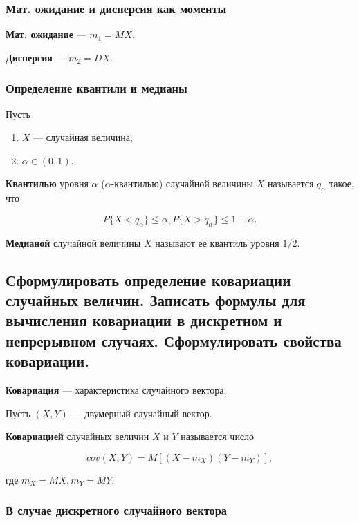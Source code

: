 \subsubsection*{Мат. ожидание и дисперсия как моменты}

\textbf{Мат. ожидание} --- $m_{1} = MX$.

\textbf{Дисперсия} --- $\dot m_{2} = DX$.

\subsubsection*{Определение квантили и медианы}

Пусть

\begin{enumerate}
	\item $X$ --- случайная величина;
	\item $\alpha \in (0, 1)$.
\end{enumerate}

\textbf{Квантилью} уровня $\alpha$ ($\alpha$-квантилью) случайной величины $X$ называется $q_{\alpha}$ такое, что

\begin{equation}
	P\{X < q_{\alpha}\} \leqslant \alpha, P \{X > q_{\alpha}\} \leqslant 1 - \alpha.
\end{equation}

\textbf{Медианой} случайной величины $X$ называют ее квантиль уровня $1/2$.

\subsection{Сформулировать определение ковариации случайных величин. Записать формулы для вычисления ковариации в дискретном и непрерывном случаях. Сформулировать свойства ковариации.}

\textbf{Ковариация} --- характеристика случайного вектора.

Пусть $(X, Y)$ --- двумерный случайный вектор.

\textbf{Ковариацией} случайных величин $X$ и $Y$ называется число

\begin{equation}
	cov(X, Y) = M[(X - m_{X})(Y - m_{Y})],
\end{equation}

где $m_{X} = MX, m_{Y} = MY$.

\subsubsection*{В случае дискретного случайного вектора}

